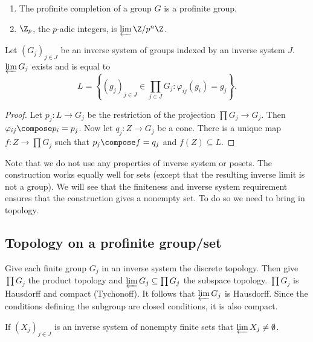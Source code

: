 \documentclass[a4paper]{article}
\begin{document}
\begin{eg}\leavevmode
  \begin{enumerate}
  \item The profinite completion of a group \(G\) is a profinite group.
  \item \(\Z_p\), the \(p\)-adic integers, is \(\varprojlim \Z/p^n\Z\).
  \end{enumerate}
\end{eg}

\begin{proposition}
  Let \((G_j)_{j \in J}\) be an inverse system of groups indexed by an inverse system \(J\). \(\varprojlim G_j\) exists and is equal to
  \[
    L = \left\{ (g_j)_{j \in J} \in \prod_{j \in J} G_j: \varphi_{ij} (g_i) = g_j \right\}.
  \]
\end{proposition}

\begin{proof}
  Let \(p_j: L \to G_j\) be the restriction of the projection \(\prod G_j \to G_j\). Then \(\varphi_{ij} \compose p_i = p_j\). Now let \(q_j: Z \to G_j\) be a cone. There is a unique map \(f: Z \to \prod G_j\) such that \(p_j \compose f = q_j\) and \(f(Z) \subseteq L\).
\end{proof}

Note that we do not use any properties of inverse system or posets. The construction works equally well for sets (except that the resulting inverse limit is not a group). We will see that the finiteness and inverse system requirement ensures that the construction gives a nonempty set. To do so we need to bring in topology.

\subsection{Topology on a profinite group/set}

Give each finite group \(G_j\) in an inverse system the discrete topology. Then give \(\prod G_j\) the product topology and \(\varprojlim G_j \subseteq \prod G_j\) the subspace topology. \(\prod G_j\) is Hausdorff and compact (Tychonoff). It follows that \(\varprojlim G_j\) is Hausdorff. Since the conditions defining the subgroup are closed conditions, it is also compact.

\begin{proposition}
  If \((X_j)_{j \in J}\) is an inverse system of nonempty finite sets that \(\varprojlim X_j \ne \emptyset\).
\end{proposition}
\end{document}
